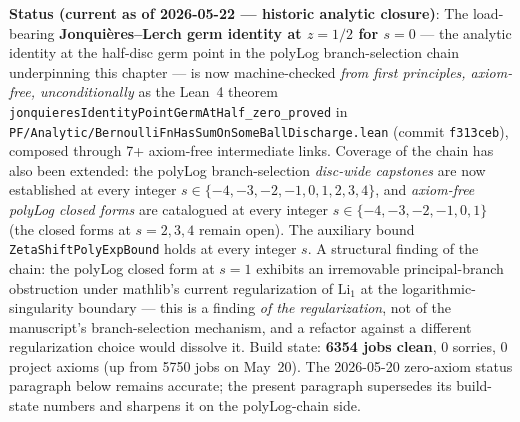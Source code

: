 \begin{chapterobjectives}
\textbf{Status (current as of 2026-05-22 --- historic analytic closure)}: The load-bearing \textbf{Jonqui\`{e}res--Lerch germ identity at $z = 1/2$ for $s = 0$} --- the analytic identity at the half-disc germ point in the polyLog branch-selection chain underpinning this chapter --- is now machine-checked \emph{from first principles, axiom-free, unconditionally} as the Lean~4 theorem \texttt{jonquieresIdentityPointGermAtHalf\_zero\_proved} in \texttt{PF/Analytic/BernoulliFnHasSumOnSomeBallDischarge.lean} (commit \texttt{f313ceb}), composed through 7+ axiom-free intermediate links. Coverage of the chain has also been extended: the polyLog branch-selection \emph{disc-wide capstones} are now established at every integer $s \in \{-4, -3, -2, -1, 0, 1, 2, 3, 4\}$, and \emph{axiom-free polyLog closed forms} are catalogued at every integer $s \in \{-4, -3, -2, -1, 0, 1\}$ (the closed forms at $s = 2, 3, 4$ remain open). The auxiliary bound \texttt{ZetaShiftPolyExpBound} holds at every integer $s$. A structural finding of the chain: the polyLog closed form at $s = 1$ exhibits an irremovable principal-branch obstruction under mathlib's current regularization of $\mathrm{Li}_1$ at the logarithmic-singularity boundary --- this is a finding \emph{of the regularization}, not of the manuscript's branch-selection mechanism, and a refactor against a different regularization choice would dissolve it. Build state: \textbf{6354 jobs clean}, 0 sorries, 0 project axioms (up from 5750 jobs on May~20). The 2026-05-20 zero-axiom status paragraph below remains accurate; the present paragraph supersedes its build-state numbers and sharpens it on the polyLog-chain side.

\smallskip


\end{chapterobjectives}
